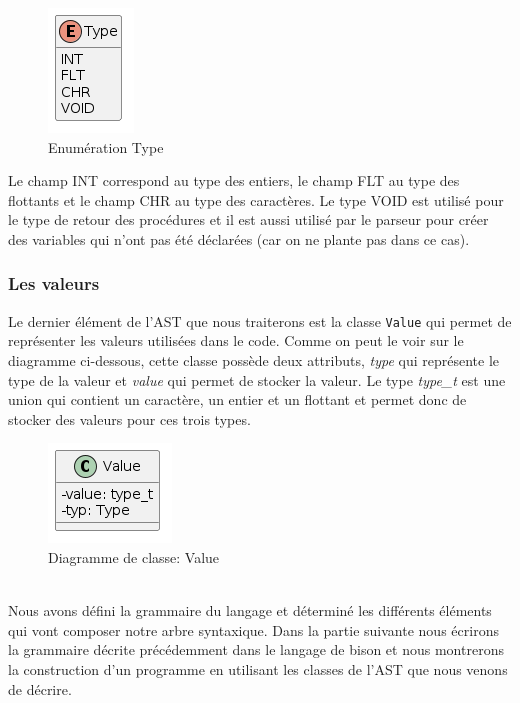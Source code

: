 \documentclass[a4paper]{article}%
\begin{document}
\begin{figure}[h!]
  \begin{center}
  \includegraphics[scale=0.5]{../ressources/diagrams/Type.png}
  \caption{Enumération Type}
  \end{center}
\end{figure}

Le champ INT correspond au type des entiers, le champ FLT au type des flottants
et le champ CHR au type des caractères. Le type VOID est utilisé pour le type de
retour des procédures et il est aussi utilisé par le parseur pour créer des
variables qui n'ont pas été déclarées (car on ne plante pas dans ce cas).

\subsubsection*{Les valeurs}

Le dernier élément de l'AST que nous traiterons est la classe \lstinline{Value}
qui permet de représenter les valeurs utilisées dans le code. Comme on peut le
voir sur le diagramme ci-dessous, cette classe possède deux attributs,
\textit{type} qui représente le type de la valeur et \textit{value} qui permet
de stocker la valeur. Le type \textit{type\_t} est une union qui contient un
caractère, un entier et un flottant et permet donc de stocker des valeurs pour
ces trois types.

\begin{figure}[h!]
  \begin{center}
  \includegraphics[scale=0.5]{../ressources/diagrams/value.png}
  \caption{Diagramme de classe: Value}
  \end{center}
\end{figure}
~\\

Nous avons défini la grammaire du langage et déterminé les différents éléments
qui vont composer notre arbre syntaxique. Dans la partie suivante nous écrirons
la grammaire décrite précédemment dans le langage de bison et nous montrerons
la construction d'un programme en utilisant les classes de l'AST que nous
venons de décrire.
\end{document}
